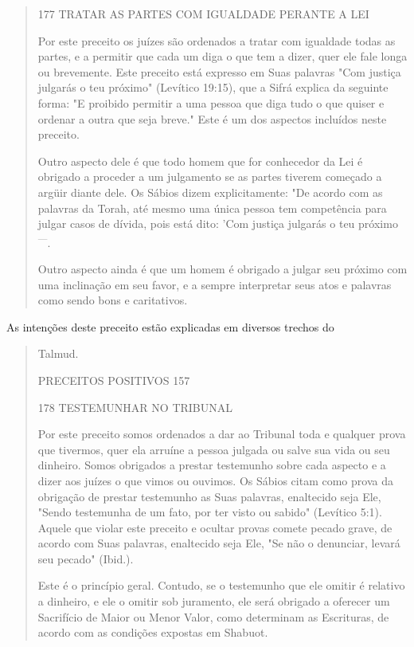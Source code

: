 \begin{quote}
177 TRATAR AS PARTES COM IGUALDADE PERANTE A LEI

Por este preceito os juízes são ordenados a tratar com igualdade to­das
as partes, e a permitir que cada um diga o que tem a dizer, quer ele
fale longa ou brevemente. Este preceito está expresso em Suas palavras
"Com justi­ça julgarás o teu próximo" (Levítico 19:15), que a Sifrá
explica da seguinte for­ma: "E proibido permitir a uma pessoa que diga
tudo o que quiser e ordenar a outra que seja breve." Este é um dos
aspectos incluídos neste preceito.

Outro aspecto dele é que todo homem que for conhecedor da Lei é obrigado
a proceder a um julgamento se as partes tiverem começado a argüir diante
dele. Os Sábios dizem explicitamente: "De acordo com as palavras da
Torah, até mesmo uma única pessoa tem competência para julgar casos de
dívi­da, pois está dito: 'Com justiça julgarás o teu
próximo\textsuperscript{---}.

Outro aspecto ainda é que um homem é obrigado a julgar seu próxi­mo com
uma inclinação em seu favor, e a sempre interpretar seus atos e
pala­vras como sendo bons e caritativos.
\end{quote}

As intenções deste preceito estão explicadas em diversos trechos do

\begin{quote}
Talmud.

PRECEITOS POSITIVOS 157

178 TESTEMUNHAR NO TRIBUNAL

Por este preceito somos ordenados a dar ao Tribunal toda e qual­quer
prova que tivermos, quer ela arruíne a pessoa julgada ou salve sua vida
ou seu dinheiro. Somos obrigados a prestar testemunho sobre cada aspecto
e a dizer aos juízes o que vimos ou ouvimos. Os Sábios citam como prova
da obrigação de prestar testemunho as Suas palavras, enaltecido seja
Ele, "Sendo testemunha de um fato, por ter visto ou sabido" (Levítico
5:1). Aquele que vio­lar este preceito e ocultar provas comete pecado
grave, de acordo com Suas palavras, enaltecido seja Ele, "Se não o
denunciar, levará seu pecado" (Ibid.).

Este é o princípio geral. Contudo, se o testemunho que ele omitir é
relativo a dinheiro, e ele o omitir sob juramento, ele será obrigado a
oferecer um Sacrifício de Maior ou Menor Valor, como determinam as
Escrituras, de acor­do com as condições expostas em Shabuot.
\end{quote}


